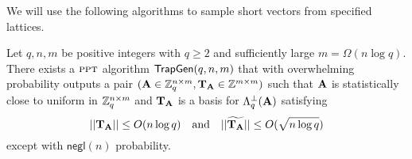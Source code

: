 We will use the following algorithms to sample short vectors from specified lattices.

\begin{lemma} \label{lem:trapgen}
Let $q, n, m$ be positive integers with $q\geq 2$ and sufficiently large $m = \Omega(n \log q)$. There exists a $\textsc{ppt}$ algorithm $\mathsf{TrapGen}(q, n, m)$ that with overwhelming probability outputs a pair $(\mathbf{A}\in\mathbb{Z}_q^{n\times m}, \mathbf{T}_{\mathbf{A}} \in\mathbb{Z}^{m\times m})$ such that $\mathbf{A}$ is statistically close to uniform in $\mathbb{Z}_q^{n\times m}$ and $\mathbf{T}_{\mathbf{A}}$ is a basis for $\Lambda_q^{\bot}(\mathbf{A})$ satisfying
$$||\mathbf{T}_{\mathbf{A}}||\leq O(n\log q)\quad\mbox{and}\quad||\widetilde{\mathbf{T}_{\mathbf{A}}}||\leq O(\sqrt{n\log q})$$
except with $\mathsf{negl}(n)$ probability.
\end{lemma}

